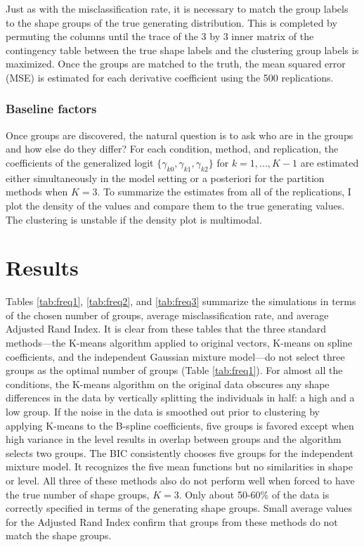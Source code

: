 Just as with the misclassification rate, it is necessary to match the group labels to the shape groups of the true generating distribution. This is completed by permuting the columns until the trace of the 3 by 3 inner matrix of the contingency table between the true shape labels and the clustering group labels is maximized. Once the groups are matched to the truth, the mean squared error (MSE) is estimated for each derivative coefficient using the 500 replications.

\subsubsection{Baseline factors}
Once groups are discovered, the natural question is to ask who are in the groups and how else do they differ? For each condition, method, and replication, the coefficients of the generalized logit $\{\gamma_{k0},\gamma_{k1},\gamma_{k2}\}$ for $k=1,...,K-1$ are estimated either simultaneously in the model setting or a posteriori for the partition methods when $K=3$. To summarize the estimates from all of the replications, I plot the density of the values and compare them to the true generating values. The clustering is unstable if the density plot is multimodal.

\section{Results}
Tables \ref{tab:freq1}, \ref{tab:freq2}, and \ref{tab:freq3} summarize the simulations in terms of the chosen number of groups, average misclassification rate, and average Adjusted Rand Index. It is clear from these tables that the three standard methods---the K-means algorithm applied to original vectors, K-means on spline coefficients, and the independent Gaussian mixture model---do not select three groups as the optimal number of groups (Table \ref{tab:freq1}). For almost all the conditions, the K-means algorithm on the original data obscures any shape differences in the data by vertically splitting the individuals in half: a high and a low group. If the noise in the data is smoothed out prior to clustering by applying K-means to the B-spline coefficients, five groups is favored except when high variance in the level results in overlap between groups and the algorithm selects two groups. The BIC consistently chooses five groups for the independent mixture model. It recognizes the five mean functions but no similarities in shape or level. All three of these methods also do not perform well when forced to have the true number of shape groups, $K=3$. Only about 50-60\% of the data is correctly specified in terms of the generating shape groups. Small average values for the Adjusted Rand Index confirm that groups from these methods do not match the shape groups.


